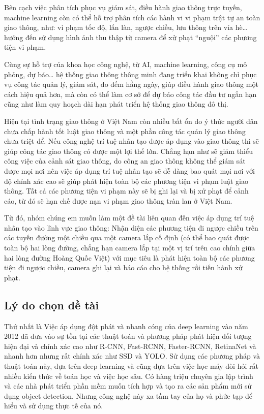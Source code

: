 \documentclass[14pt,oneside,a4paper]{extreport}
\begin{document}
Bên cạch việc phân tích phục vụ giám sát, điều hành giao thông trực tuyến, machine learning còn có thể hỗ trợ phân tích các hành vi vi phạm trật tự an toàn giao thông, như: vi phạm tốc độ, lấn làn, ngược chiều, lưu thông trên vỉa hè… hướng đến sử dụng hình ảnh thu thập từ camera để xử phạt “nguội” các phương tiện vi phạm.

Cùng sự hỗ trợ của khoa học công nghệ, từ AI, machine learning, công cụ mô phỏng, dự báo… hệ thống giao thông thông minh đang triển khai không chỉ phục vụ công tác quản lý, giám sát, đo đếm hằng ngày, giúp điều hành giao thông một cách hiệu quả hơn, mà còn có thể làm cơ sở để dự báo công tác đầu tư ngắn hạn cũng như làm quy hoạch dài hạn phát triển hệ thống giao thông đô thị.

Hiện tại tình trạng giao thông ở Việt Nam còn nhiều bất ổn do ý thức người dân chưa chấp hành tốt luật giao thông và một phần công tác quản lý giao thông chưa triệt để. Nếu công nghệ trí tuệ nhân tạo được áp dụng vào giao thông thì sẽ giúp công tác giao thông có được một lợi thế lớn. Chẳng hạn như sẽ giảm thiểu công việc của cảnh sát giao thông, do công an giao thông không thể giám sát được mọi nơi nên việc áp dụng trí tuệ nhân tạo sẽ dễ dàng bao quát mọi nơi với độ chính xác cao sẽ giúp phát hiện toàn bộ các phương tiện vi phạm luật giao thông. Tất cả các phương tiện vi phạm này sẽ bị ghi lại và bị xử phạt để cảnh cáo, từ đó sẽ hạn chế được nạn vi phạm giao thông tràn lan ở Việt Nam.

Từ đó, nhóm chúng em muốn làm một đề tài liên quan đến việc áp dụng trí tuệ nhân tạo vào lĩnh vực giao thông: Nhận diện các phương tiện đi ngược chiều trên các tuyến đường một chiều qua một camera lắp cố định (có thể bao quát được toàn bộ hai lòng đường, chẳng hạn camera lắp tại một vị trí trên cao chính giữa hai lòng đường Hoàng Quốc Việt) với mục tiêu là phát hiện toàn bộ các phương tiện đi ngược chiều, camera ghi lại và báo cáo cho hệ thống rồi tiến hành xử phạt.

\subsection{Lý do chọn đề tài}
Thứ nhất là Việc áp dụng đột phát và nhanh cóng của deep learning vào năm 2012 đã đưa vào sự tồn tại các thuật toán và phương pháp phát hiện đối tượng hiện đại và chính xác cao như R-CNN, Fast-RCNN, Faster-RCNN, RetinaNet và nhanh hơn nhưng rất chính xác như SSD và YOLO. Sử dụng các phương pháp và thuật toán này, dựa trên deep learning và cũng dựa trên việc học máy đòi hỏi rất nhiều kiến thức về toán học và việc học sâu. Có hàng triệu chuyên gia lập trình và các nhà phát triển phần mềm muốn tích hợp và tạo ra các sản phẩm mới sử dụng object detection. Nhưng công nghệ này xa tầm tay của họ và phức tạp để hiểu và sử dụng thực tế của nó.
\end{document}
